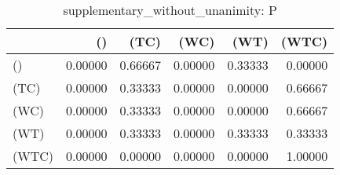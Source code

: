 \begin{table}
\centering
\caption{supplementary_without_unanimity: P}
\begin{tabular}{lrrrrr}
\toprule
{} &      () &    (TC) &    (WC) &    (WT) &   (WTC) \\
\midrule
()    & 0.00000 & 0.66667 & 0.00000 & 0.33333 & 0.00000 \\
(TC)  & 0.00000 & 0.33333 & 0.00000 & 0.00000 & 0.66667 \\
(WC)  & 0.00000 & 0.33333 & 0.00000 & 0.00000 & 0.66667 \\
(WT)  & 0.00000 & 0.33333 & 0.00000 & 0.33333 & 0.33333 \\
(WTC) & 0.00000 & 0.00000 & 0.00000 & 0.00000 & 1.00000 \\
\bottomrule
\end{tabular}
\end{table}
